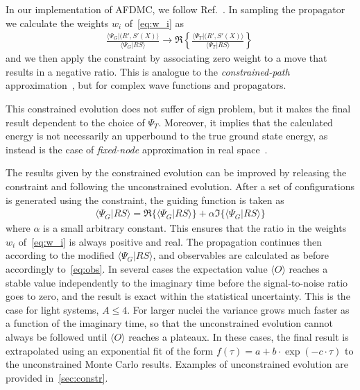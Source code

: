 \documentclass[aps,prc,twocolumn,superscriptaddress,floatfix]{revtex4-1}
\begin{document}
In our implementation of AFDMC, we follow Ref.~\cite{Zhang:2003}. 
In sampling the propagator we calculate the weights $w_i$ of~\cref{eq:w_i} as
\begin{align}
\frac{\langle\Psi_G|(R',S'(X)\rangle}{\langle\Psi_G|RS\rangle}\rightarrow
\Re\left\{\frac{\langle\Psi_T|(R',S'(X)\rangle}{\langle\Psi_T|RS\rangle}\right\}\,
\end{align}
and we then apply the constraint by associating zero weight to a move
that results in a negative ratio. This is analogue to the \emph{constrained-path} 
approximation~\cite{Zhang:1997}, but for complex wave functions and propagators.

This constrained evolution does not suffer of sign problem, but it makes the final result
dependent to the choice of $\Psi_T$. Moreover, it implies that the calculated energy is not necessarily
an upperbound to the true ground state energy, as instead is the case of \emph{fixed-node} approximation 
in real space~\cite{Ortiz:1993,Foulkes:2001}.

The results given by the constrained evolution can be improved by releasing the 
constraint and following the unconstrained evolution.
After a set of configurations is generated using the constraint, the guiding function
is taken as
\begin{align}
\langle\Psi_G|RS\rangle=\Re\big\{\langle\Psi_G|RS\rangle\big\}+\alpha\Im\big\{\langle\Psi_G|RS\rangle\big\}
\end{align}
where $\alpha$ is a small arbitrary constant.
This ensures that the ratio in the weights $w_i$ of~\cref{eq:w_i} is always positive and real.
The propagation continues then according to the modified $\langle\Psi_G|RS\rangle$, and 
observables are calculated as before accordingly to~\cref{eq:obs}.
In several cases the expectation value $\langle O\rangle$ reaches a stable value independently
to the imaginary time before the signal-to-noise ratio goes to zero, and the result is exact 
within the statistical uncertainty.
This is the case for light systems, $A\le4$. For larger nuclei the variance grows much faster 
as a function of the imaginary time, so that the unconstrained evolution cannot always be 
followed until $\langle O\rangle$ reaches a plateaux. In these cases, the final result is
extrapolated using an exponential fit of the form $f(\tau)=a+b\cdot\exp(-c\cdot\tau)$ to the unconstrained
Monte Carlo results. Examples of unconstrained evolution are provided in~\cref{sec:constr}.
\end{document}
